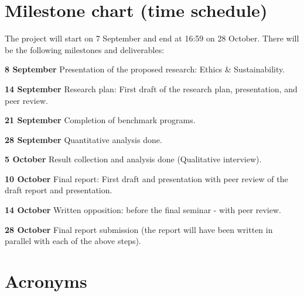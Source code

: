 \documentclass[12pt,twoside,english]{article}
\begin{document}
\clearpage
\section{Milestone chart (time schedule)}
\label{sect:milestones}
The project will start on 7 September and end at 16:59 on 28 October. There will be the following milestones and deliverables:

\begin{description}
\item{\textbf{8 September}} Presentation of the proposed research: Ethics \& Sustainability.

\item{\textbf{14 September}} Research plan: First draft of the research plan, presentation, and peer review.

\item{\textbf{21 September}} Completion of benchmark programs.

\item{\textbf{28 September}} Quantitative analysis done.

\item{\textbf{5 October}} Result collection and analysis done (Qualitative interview).

\item{\textbf{10 October}} Final report: First draft and presentation with peer review of the draft report and presentation.

\item{\textbf{14 October}} Written opposition: before the final seminar - with peer review.

\item{\textbf{28 October}} Final report submission (the report will have been written in parallel with each of the above steps).


\end{description}

\clearpage



\section{Acronyms}
\renewcommand{\glossarysection}[2][]{} %
\printglossary[type=\acronymtype,nonumberlist]
\clearpage
\end{document}
